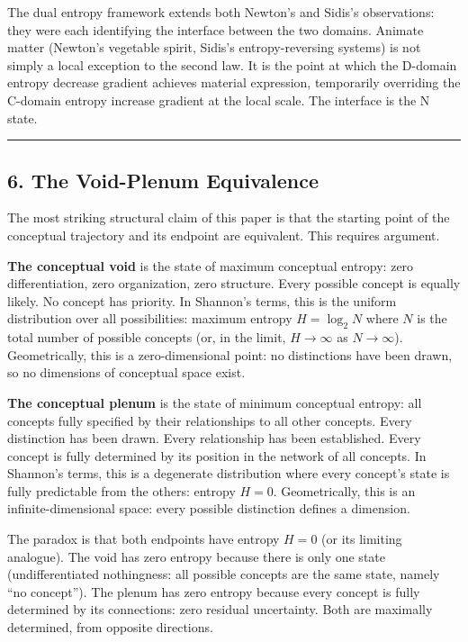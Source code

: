 \documentclass[
  11pt,
  letterpaper,
]{article}
\begin{document}
The dual entropy framework extends both Newton's and Sidis's
observations: they were each identifying the interface between the two
domains. Animate matter (Newton's vegetable spirit, Sidis's
entropy-reversing systems) is not simply a local exception to the second
law. It is the point at which the D-domain entropy decrease gradient
achieves material expression, temporarily overriding the C-domain
entropy increase gradient at the local scale. The interface is the N
state.

\begin{center}\rule{0.5\linewidth}{0.5pt}\end{center}

\subsection{6. The Void-Plenum
Equivalence}\label{the-void-plenum-equivalence}

The most striking structural claim of this paper is that the starting
point of the conceptual trajectory and its endpoint are equivalent. This
requires argument.

\textbf{The conceptual void} is the state of maximum conceptual entropy:
zero differentiation, zero organization, zero structure. Every possible
concept is equally likely. No concept has priority. In Shannon's terms,
this is the uniform distribution over all possibilities: maximum entropy
\(H = \log_2 N\) where \(N\) is the total number of possible concepts
(or, in the limit, \(H \to \infty\) as \(N \to \infty\)). Geometrically,
this is a zero-dimensional point: no distinctions have been drawn, so no
dimensions of conceptual space exist.

\textbf{The conceptual plenum} is the state of minimum conceptual
entropy: all concepts fully specified by their relationships to all
other concepts. Every distinction has been drawn. Every relationship has
been established. Every concept is fully determined by its position in
the network of all concepts. In Shannon's terms, this is a degenerate
distribution where every concept's state is fully predictable from the
others: entropy \(H = 0\). Geometrically, this is an
infinite-dimensional space: every possible distinction defines a
dimension.

The paradox is that both endpoints have entropy \(H = 0\) (or its
limiting analogue). The void has zero entropy because there is only one
state (undifferentiated nothingness: all possible concepts are the same
state, namely ``no concept''). The plenum has zero entropy because every
concept is fully determined by its connections: zero residual
uncertainty. Both are maximally determined, from opposite directions.
\end{document}
